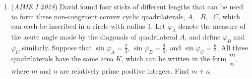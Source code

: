 \begin{enumerate}
 $\begin{tabular}{|l|c|c|c|c|c|c|c|} \hline Jump \# & \(S\)   & \(P_1\) & \(P_2\) & \(P_3\) & \(E\)        & \(P_4\) & \(P_5\) \\ \hline 1       & 0       & 1       & 0       & 0       & \textbf{0}   & 0       & 1       \\ \hline 2       & 2       & 0       & 1       & 0       & \textbf{0}   & 1       & 0       \\ \hline 3       & 0       & 3       & 0       & 1       & \textbf{1}   & 0       & 3       \\ \hline 4       & 6       & 0       & 4       & 0       & \textbf{1}   & 3       & 0       \\ \hline 5       & 0       & 10      & 0       & 4       & \textbf{3}   & 0       & 9       \\ \hline 6       & 19      & 0       & 14      & 0       & \textbf{4}   & 9       & 0       \\ \hline 7       & 0       & 33      & 0       & 14      & \textbf{9}   & 0       & 28      \\ \hline 8       & 61      & 0       & 47      & 0       & \textbf{14}  & 28      & 0       \\ \hline 9       & 0       & 108     & 0       & 47      & \textbf{28}  & 0       & 89      \\ \hline 10      & 197     & 0       & 155     & 0       & \textbf{47}  & 89      & 0       \\ \hline 11      & 0       & 352     & 0       & 155     & \textbf{89}  & 0       & 286     \\ \hline 12      & 638     & 0       & 507     & 0       & \textbf{155} & 286     & 0       \\ \hline \end{tabular}$
$0+0+1+1+3+4+9+14+28+47+89+155=\boxed{351}.$

 \textbf{Remark} The numbers being added correspond to OEIS sequence A006053, which has recurrence relation $a(n) = a(n-1) + 2\cdot a(n-2) - a(n-3)$, as in Solution 2.

 


	\item (\textit{AIME I 2018}) David found four sticks of different lengths that can be used to form three non-congruent convex cyclic quadrilaterals, $A,\text{ }B,\text{ }C$, which can each be inscribed in a circle with radius $1$. Let $\varphi_A$ denote the measure of the acute angle made by the diagonals of quadrilateral $A$, and define $\varphi_B$ and $\varphi_C$ similarly. Suppose that $\sin\varphi_A=\frac{2}{3}$, $\sin\varphi_B=\frac{3}{5}$, and $\sin\varphi_C=\frac{6}{7}$. All three quadrilaterals have the same area $K$, which can be written in the form $\dfrac{m}{n}$, where $m$ and $n$ are relatively prime positive integers. Find $m+n$.



\end{enumerate}

